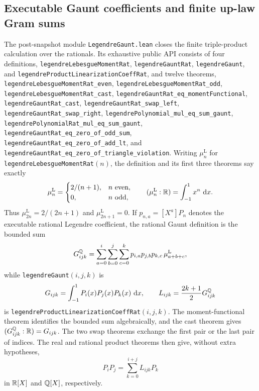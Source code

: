 \documentclass[11pt,oneside]{article}
\theoremstyle{definition}
\theoremstyle{remark}
\begin{document}
\subsection{Executable Gaunt coefficients and finite up-law Gram sums}
\label{ch:legendre-gaunt}

The post-snapshot module \nolinkurl{LegendreGaunt.lean} closes the finite
triple-product calculation over the rationals.  Its exhaustive public API consists of
four definitions,
\nolinkurl{legendreLebesgueMomentRat},
\nolinkurl{legendreGauntRat},
\nolinkurl{legendreGaunt}, and
\nolinkurl{legendreProductLinearizationCoeffRat}, and twelve theorems,
\nolinkurl{legendreLebesgueMomentRat_even},
\nolinkurl{legendreLebesgueMomentRat_odd},
\nolinkurl{legendreLebesgueMomentRat_cast},
\nolinkurl{legendreGauntRat_eq_momentFunctional},
\nolinkurl{legendreGauntRat_cast},
\nolinkurl{legendreGauntRat_swap_left},
\nolinkurl{legendreGauntRat_swap_right},
\nolinkurl{legendrePolynomial_mul_eq_sum_gaunt},
\nolinkurl{legendrePolynomialRat_mul_eq_sum_gaunt},
\nolinkurl{legendreGauntRat_eq_zero_of_odd_sum},
\nolinkurl{legendreGauntRat_eq_zero_of_add_lt}, and
\nolinkurl{legendreGauntRat_eq_zero_of_triangle_violation}.
Writing \(\mu_n^{\mathrm L}\) for
\nolinkurl{legendreLebesgueMomentRat}\((n)\), the definition and its first three
theorems say exactly
\[
 \mu_n^{\mathrm L}=
 \begin{cases}
   2/(n+1),&n\ \text{even},\\
   0,&n\ \text{odd},
 \end{cases}
 \qquad
 (\mu_n^{\mathrm L}:\mathbb{R})=\int_{-1}^{1}x^n\,\mathop{}\!\mathrm{d} x.
\]
Thus \(\mu_{2n}^{\mathrm L}=2/(2n+1)\) and
\(\mu_{2n+1}^{\mathrm L}=0\).  If \(p_{n,a}=[X^a]P_n\) denotes the executable
rational Legendre coefficient, the rational Gaunt definition is the bounded sum
\[
 G^{\mathbb{Q}}_{ijk}
 =\sum_{a=0}^{i}\sum_{b=0}^{j}\sum_{c=0}^{k}
   p_{i,a}p_{j,b}p_{k,c}\,\mu_{a+b+c}^{\mathrm L},
\]
while \nolinkurl{legendreGaunt}\((i,j,k)\) is
\[
 G_{ijk}=\int_{-1}^{1}P_i(x)P_j(x)P_k(x)\,\mathop{}\!\mathrm{d} x,
 \qquad
 L_{ijk}=\frac{2k+1}{2}G^{\mathbb{Q}}_{ijk}
\]
is \nolinkurl{legendreProductLinearizationCoeffRat}\((i,j,k)\).
The moment-functional theorem identifies the bounded sum algebraically, and the cast
theorem gives \((G^{\mathbb{Q}}_{ijk}:\mathbb{R})=G_{ijk}\).  The two swap
theorems exchange the first pair or the last pair of indices.  The real and rational
product theorems then give, without extra hypotheses,
\[
 P_iP_j=\sum_{k=0}^{i+j}L_{ijk}P_k
\]
in \(\mathbb{R}[X]\) and \(\mathbb{Q}[X]\), respectively.
\end{document}
